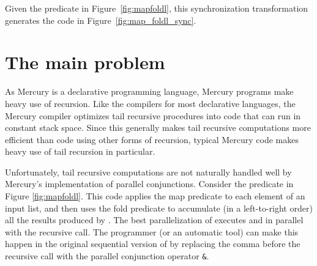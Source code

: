 
Given the \mapfoldl predicate in Figure~\ref{fig:mapfoldl},
this synchronization transformation
generates the code in Figure~\ref{fig:map_foldl_sync}.

\section{The main problem}
\label{sec:problem}

As Mercury is a declarative programming language,
Mercury programs make heavy use of recursion.
Like the compilers for most declarative languages,
the Mercury compiler optimizes tail recursive procedures
into code that can run in constant stack space.
Since this generally makes tail recursive computations
more efficient than code using other forms of recursion,
typical Mercury code makes heavy use of tail recursion in particular.

Unfortunately, tail recursive computations are not naturally handled well
by Mercury's implementation of parallel conjunctions.
Consider the \mapfoldl{} predicate in Figure \ref{fig:mapfoldl}.
This code applies the map predicate  to each element of an input list,
and then uses the fold predicate 
to accumulate (in a left-to-right order) all the results produced by .
The best parallelization of \mapfoldl{} executes
 and  in parallel with the recursive call.
The programmer (or an automatic tool) can make this happen
in the original sequential version of \mapfoldl
by replacing the comma before the recursive call
with the parallel conjunction operator \verb'&'.

